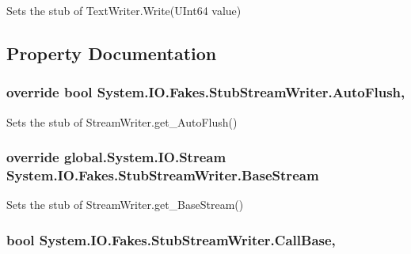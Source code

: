 Sets the stub of Text\-Writer.\-Write(\-U\-Int64 value)



\subsection{Property Documentation}
\hypertarget{class_system_1_1_i_o_1_1_fakes_1_1_stub_stream_writer_aa41a13ea97c2fb374fc1fd820a104561}{
\subsubsection[{Auto\-Flush}]{\setlength{\rightskip}{0pt plus 5cm}override bool System.\-I\-O.\-Fakes.\-Stub\-Stream\-Writer.\-Auto\-Flush\hspace{0.3cm}{\ttfamily [get]}, {\ttfamily [set]}}}\label{class_system_1_1_i_o_1_1_fakes_1_1_stub_stream_writer_aa41a13ea97c2fb374fc1fd820a104561}


Sets the stub of Stream\-Writer.\-get\-\_\-\-Auto\-Flush()

\hypertarget{class_system_1_1_i_o_1_1_fakes_1_1_stub_stream_writer_a62a63cf4cc7520e56be690213aa04c3b}{
\subsubsection[{Base\-Stream}]{\setlength{\rightskip}{0pt plus 5cm}override global.\-System.\-I\-O.\-Stream System.\-I\-O.\-Fakes.\-Stub\-Stream\-Writer.\-Base\-Stream\hspace{0.3cm}{\ttfamily [get]}}}\label{class_system_1_1_i_o_1_1_fakes_1_1_stub_stream_writer_a62a63cf4cc7520e56be690213aa04c3b}


Sets the stub of Stream\-Writer.\-get\-\_\-\-Base\-Stream()

\hypertarget{class_system_1_1_i_o_1_1_fakes_1_1_stub_stream_writer_a147172eb2eaab54a5fd8c13972f4abfd}{
\subsubsection[{Call\-Base}]{\setlength{\rightskip}{0pt plus 5cm}bool System.\-I\-O.\-Fakes.\-Stub\-Stream\-Writer.\-Call\-Base\hspace{0.3cm}{\ttfamily [get]}, {\ttfamily [set]}}}\label{class_system_1_1_i_o_1_1_fakes_1_1_stub_stream_writer_a147172eb2eaab54a5fd8c13972f4abfd}


